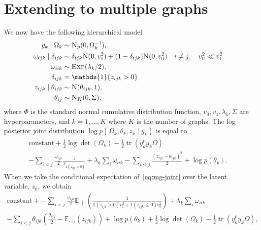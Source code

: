 \documentclass[a4paper, 11pt, oneside]{report}
\DeclareMathOperator{\tr}{tr}
\newcommand{\E}{\mathbb{E}}
\newcommand{\1}{\mathds{1}}
\newcommand{\Np}{\textsc{N}_p}
\newcommand{\Nor}{\textsc{N}}
\newcommand{\Exp}{\textsc{Exp}}
\begin{document}
\chapter{Extending to multiple graphs}
We now have the following hierarchical model
\begin{align*}
	y_k \mid \Omega_k              & \sim \Np(0, \Omega_k^{-1}),                                                                                \\
	\omega_{ijk} \mid \delta_{ijk} & \sim \delta_{ijk} \Nor(0, v_1^2) + (1 - \delta_{ijk}) \Nor(0, v_0^2) \quad i \neq j, \quad v_0^2 \ll v_1^2 \\
	\omega_{iik}                   & \sim \Exp(\lambda_k/2),                                                                                    \\
	\delta_{ijk}                   & = \1\{z_{ijk} > 0\}                                                                                        \\
	z_{ijk} \mid \theta_{ijk}      & \sim \Nor(\theta_{ijk}, 1),                                                                                \\
	\theta_{ij}                    & \sim \textsc{N}_K(0, \Sigma),
\end{align*}
where $\Phi$ is the standard normal cumulative distribution function, $v_0,
	v_1, \lambda_k, \Sigma$ are hyperparameters, and $k=1,\dots,K$ where $K$ is the
number of graphs.
The log posterior joint distribution $\log p(\Omega_k, \theta_k, z_k \mid
	y_k)$ is equal to
\begin{multline}\label{eq:mg-joint}
	\text{constant} + \frac{1}{2} \log\det(\Omega_k) -\frac{1}{2} \tr(y_k^t y_k \Omega) \\
	- \sum_{i<j} \frac{\omega_{ijk}}{2} \frac{1}{v_{\1(z_{ijk} > 0)}} + \lambda_k \sum_i \omega_{iik}
	- \sum_{i < j} \frac{(z_{ijk} - \theta_{ijk})^2}{2}
	+ \log p(\theta_k).
\end{multline}
When we take the conditional expectation of~\eqref{eq:mg-joint} over the latent
variable, $z_k$, we obtain
\begin{multline}\label{eq:mg-exp}
	\text{constant} +  - \sum_{i<j} \frac{\omega_{ijk}}{2}
	\E_{\cdot \mid \cdot}\left(\frac{1}{\1(z_{ijk} > 0)v_1^2 + \1(z_{ijk} \leq 0) v_0^2}\right)
	+ \lambda_k \sum_i \omega_{iik} \\
	- \sum_{i < j} \theta_{ijk}\left(\frac{\theta_{ijk}}{2} - \E_{\cdot \mid \cdot}(z_{ijk})\right)
	+ \log p(\theta_k) + \frac{1}{2} \log\det(\Omega_k) -\frac{1}{2} \tr(y_k^t y_k \Omega),
\end{multline}
\end{document}

